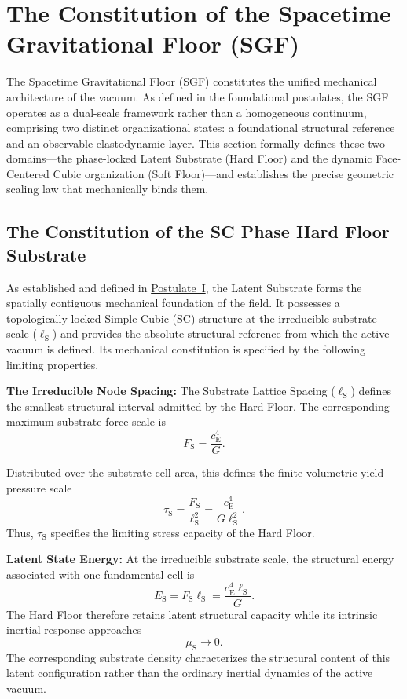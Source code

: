 \section{The Constitution of the Spacetime Gravitational Floor (SGF)}
\label{sec:sgf_constitution}
The Spacetime Gravitational Floor (SGF) constitutes the unified mechanical architecture of the vacuum. As defined in the foundational postulates, the SGF operates as a dual-scale framework rather than a homogeneous continuum, comprising two distinct organizational states: a foundational structural reference and an observable elastodynamic layer. This section formally defines these two domains---the phase-locked Latent Substrate (Hard Floor) and the dynamic Face-Centered Cubic organization (Soft Floor)---and establishes the precise geometric scaling law that mechanically binds them.

\subsection{The Constitution of the SC Phase Hard Floor Substrate}
As established and defined in \hyperref[postulate:one]{Postulate~I}, the Latent Substrate forms the spatially contiguous mechanical foundation of the field. It possesses a topologically locked Simple Cubic (SC) structure at the irreducible substrate scale ($\ell_{\mathrm{S}}$) and provides the absolute structural reference from which the active vacuum is defined. Its mechanical constitution is specified by the following limiting properties.

\noindent\textbf{The Irreducible Node Spacing:} The Substrate Lattice Spacing ($\ell_{\mathrm{S}}$) defines the smallest structural interval admitted by the Hard Floor. The corresponding maximum substrate force scale is
\begin{equation}
    F_{\mathrm{S}} = \frac{c_{\mathrm{E}}^4}{G}.
\end{equation}

Distributed over the substrate cell area, this defines the finite volumetric yield-pressure scale
\begin{equation}
    \tau_{\mathrm{S}} = \frac{F_{\mathrm{S}}}{\ell_{\mathrm{S}}^2} = \frac{c_{\mathrm{E}}^4}{G\ell_{\mathrm{S}}^2}.
\end{equation}
Thus, $\tau_{\mathrm{S}}$ specifies the limiting stress capacity of the Hard Floor.

\noindent\textbf{Latent State Energy:} At the irreducible substrate scale, the structural energy associated with one fundamental cell is
\begin{equation}
    E_{\mathrm{S}} = F_{\mathrm{S}}\ell_{\mathrm{S}} = \frac{c_{\mathrm{E}}^4\ell_{\mathrm{S}}}{G}.
\end{equation}
The Hard Floor therefore retains latent structural capacity while its intrinsic inertial response approaches
\begin{equation}
    \mu_{\mathrm{S}} \rightarrow 0.
\end{equation}
The corresponding substrate density characterizes the structural content of this latent configuration rather than the ordinary inertial dynamics of the active vacuum.

